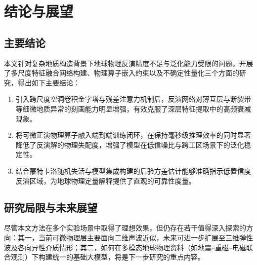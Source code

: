 \chapter{结论与展望}

\section{主要结论}

本文针对复杂地质构造背景下地球物理反演精度不足与泛化能力受限的问题，开展了多尺度特征融合网络构建、物理算子嵌入约束以及不确定性量化三个方面的研究，得出如下主要结论：

\begin{enumerate}[label=（\arabic*）]
  \item 引入跨尺度空洞卷积金字塔与残差注意力机制后，反演网络对薄互层与断裂带等细微地质异常的刻画能力明显增强，有效克服了深层特征提取中的高频衰减现象。
  \item 将可微正演物理算子融入端到端训练闭环，在保持毫秒级推理效率的同时显著降低了反演解的物理失配度，增强了模型在低信噪比与跨工区场景下的泛化稳定性。
  \item 结合蒙特卡洛随机失活与模型集成构建的后验方差估计能够准确指示低置信度反演区域，为地球物理定量解释提供了直观的可靠性度量。
\end{enumerate}

\section{研究局限与未来展望}

尽管本文方法在多个实验场景中取得了理想效果，但仍存在若干值得深入探索的方向：其一，当前可微物理层主要面向二维声波近似，未来可进一步扩展至三维弹性波及各向异性介质情形；其二，如何在多模态地球物理资料（如地震--重磁--电磁联合观测）下构建统一的基础大模型，将是下一步研究的重点内容。
